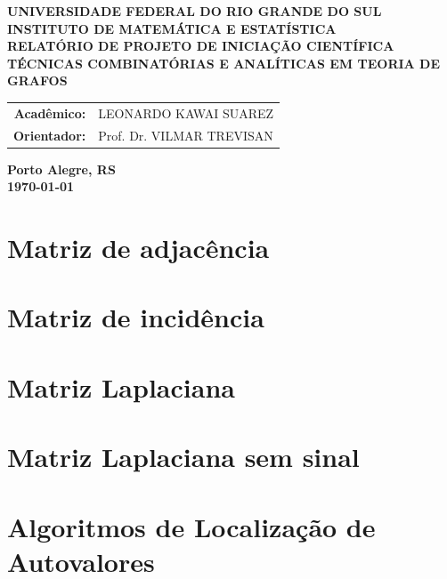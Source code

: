\documentclass{article}
\theoremstyle{plain}
\theoremstyle{definition}
\theoremstyle{remark}
\begin{document}
\begin{center}
    \textbf{\large UNIVERSIDADE FEDERAL DO RIO GRANDE DO SUL} \\
    \textbf{\large INSTITUTO DE MATEMÁTICA E ESTATÍSTICA} \\
    \vspace{3cm}
    \textbf{\Large RELATÓRIO DE PROJETO DE INICIAÇÃO CIENTÍFICA} \\
    \vspace{1cm}
    \textbf{\large TÉCNICAS COMBINATÓRIAS E ANALÍTICAS EM TEORIA DE GRAFOS} \\
    \vspace{3cm}

    \begin{tabular}{rl}
        \textbf{Acadêmico:} & LEONARDO KAWAI SUAREZ \\
        \textbf{Orientador:} & Prof. Dr. VILMAR TREVISAN \\
    \end{tabular}

    \vspace{12cm}
    \textbf{\large Porto Alegre, RS} \\
    \textbf{\large \today}
\end{center}

\newpage

\tableofcontents
\newpage

\section{Matriz de adjacência}



\section{Matriz de incidência}
\section{Matriz Laplaciana}
\section{Matriz Laplaciana sem sinal}
\section{Algoritmos de Localização de Autovalores}

\newpage

\printbibliography[title={Referências}]
\end{document}
